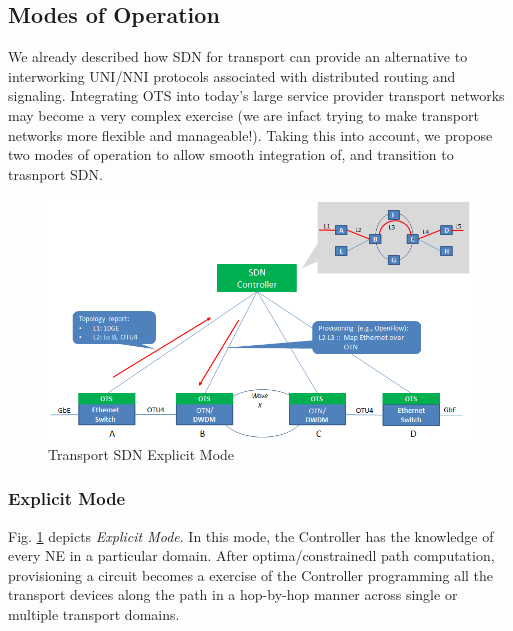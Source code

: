 \documentclass{sig-alternate-10pt}
\begin{document}
	\subsection{Modes of Operation} \label{sec:modes}
	We already described how SDN for transport can provide an alternative to interworking UNI/NNI 
	protocols associated with distributed routing and signaling. Integrating OTS into today's large service provider transport
	networks may become a very complex exercise (we are infact trying to make transport networks more
	flexible and manageable!). Taking this into account, we propose two modes of operation to allow smooth
	integration of, and transition to trasnport SDN.

	\begin{figure}[htb]
	\centering
	\includegraphics[scale=0.37]{OTSExplicit.png}
	\caption{Transport SDN Explicit Mode}
	\label{fig:OTSExplicit}
	\end{figure}

	\subsubsection{Explicit Mode}
	Fig. \ref{fig:OTSExplicit} depicts \textit{Explicit Mode}. In this mode, the Controller has the knowledge
	of every NE in a particular domain. After optima/constrainedl path computation, provisioning a circuit becomes a
	exercise of the Controller programming all the transport devices along the path in a hop-by-hop
	manner across single or multiple transport domains.
	
\end{document}
